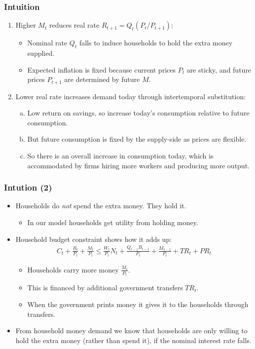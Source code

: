 \documentclass[english,xcolor=svgnames]{beamer}
\begin{document}
\begin{frame}
\frametitle{Intuition
}
\begin{enumerate}[1.]
	\item Higher $M_t$ reduces real rate $R_{t+1}=Q_t (P_t/P_{t+1})$:
	\begin{itemize}
		\item Nominal rate $Q_t$ falls to induce households to hold the extra money supplied.
		\item Expected inflation is fixed because current prices $P_t$ are sticky, and future prices $P_{t+1}$ are determined by future $M$.
	\end{itemize}
	\item Lower real rate increases demand today through intertemporal substitution:
	\begin{enumerate}[(a)]
		\item Low return on savings, so increase today's consumption relative to future consumption.
		\item But future consumption is fixed by the supply-side as prices are flexible.
		\item So there is an overall increase in consumption today, which is accommodated by firms hiring more workers and producing more output.
	\end{enumerate}
\end{enumerate}
\end{frame}


\begin{frame}
	\frametitle{Intution (2)
	}
	\begin{itemize}
		\item Households do \emph{not} spend the extra money. They hold it.
		\begin{itemize}
			\item In our model households get utility from holding money.
		\end{itemize}
		\item Household budget constraint shows how it adds up:
		\begin{align*}
			C_t + \frac{B_{t}}{P_t}  + \frac{M_t}{P_t}  \le \frac{W_t}{P_t} N_t +  \frac{Q_{t-1}B_{t-1}}{P_t} + \frac{M_{t-1}}{P_t} + TR_t+PR_t
		\end{align*}
		\begin{itemize}
			\item Households carry more money $\frac{M_t}{P_t}$.
			\item This is financed by additional government transfers $TR_t$.
			\item When the government prints money it gives it to the households through transfers.
		\end{itemize}
		\item From household money demand we know that households are only willing to hold the extra money (rather than spend it), if the nominal interest rate falls.
	\end{itemize}
\end{frame}
\end{document}
